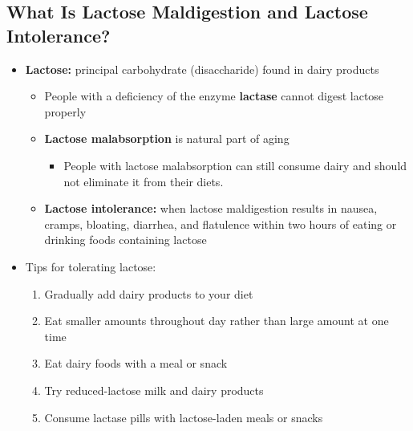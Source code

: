 \documentclass[12pt]{article}
\begin{document}
        \subsection{What Is Lactose Maldigestion and Lactose Intolerance?}
            \begin{itemize}
                \item \textbf{Lactose:} principal carbohydrate (disaccharide) found in dairy products
                    \begin{itemize}
                        \item People with a deficiency of the enzyme \textbf{lactase} cannot digest lactose properly
                        \item \textbf{Lactose malabsorption} is natural part of aging
                            \begin{itemize}
                                \item People with lactose malabsorption can still consume dairy and should not eliminate it from their diets.
                            \end{itemize}
                        \item \textbf{Lactose intolerance:} when lactose maldigestion results in nausea, cramps, bloating, diarrhea, and flatulence within two hours of eating or drinking foods containing lactose
                    \end{itemize}
                \item Tips for tolerating lactose:
                    \begin{enumerate}
                        \item Gradually add dairy products to your diet
                        \item Eat smaller amounts throughout day rather than large amount at one time
                        \item Eat dairy foods with a meal or snack
                        \item Try reduced-lactose milk and dairy products
                        \item Consume lactase pills with lactose-laden meals or snacks
                    \end{enumerate}
            
            \end{itemize}
\end{document}

